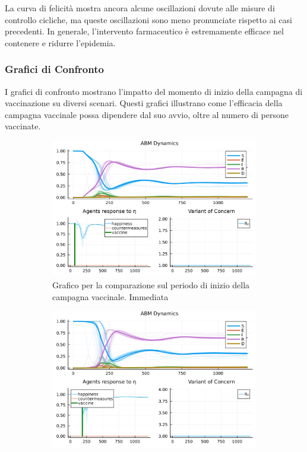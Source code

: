 La curva di felicità mostra ancora alcune oscillazioni dovute alle 
misure di controllo cicliche, ma queste oscillazioni sono meno 
pronunciate rispetto ai casi precedenti. In generale, l'intervento 
farmaceutico è estremamente efficace nel contenere e ridurre l'epidemia.
\newpage

\subsubsection{Grafici di Confronto}

I grafici di confronto mostrano l'impatto del momento di inizio della 
campagna di vaccinazione su diversi scenari. Questi grafici illustrano 
come l'efficacia della campagna vaccinale possa dipendere dal suo avvio, 
oltre al numero di persone vaccinate.

\begin{figure}[!hb]
	\centering
	\begin{subfigure}[b]{0.45\textwidth}
		\centering
		\includegraphics[width=\textwidth]{img/SocialNetworkABM_1_V.jpg}
		\caption{Grafico per la comparazione sul periodo di inizio della campagna vaccinale. Immediata}
		\label{fig:comparison_vax_1}
	\end{subfigure}
	\hfill
	\begin{subfigure}[b]{0.45\textwidth}
		\centering
		\includegraphics[width=\textwidth]{img/SocialNetworkABM_3_V.jpg}

\end{subfigure}
\end{figure}
